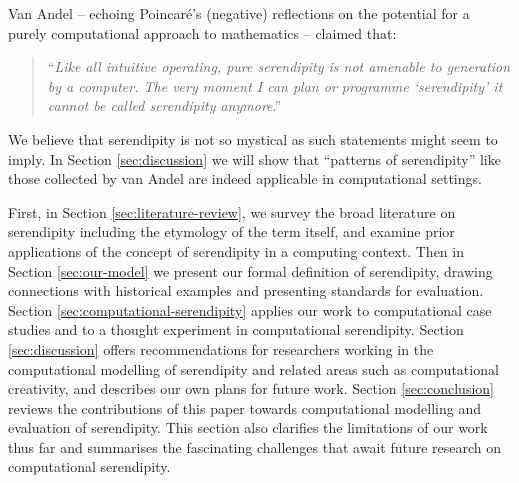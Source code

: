 Van Andel \citeyear{van1994anatomy} -- echoing Poincar\'e's
\citeyear{poincare1910creation} (negative) reflections on the potential
for a purely computational approach to mathematics -- claimed that:
\begin{quote}
``\emph{Like all intuitive operating, pure serendipity is not amenable
    to generation by a computer.  The very moment I can plan or
    programme `serendipity' it cannot be called serendipity
    anymore}.'' \cite{van1994anatomy}
\end{quote}
We believe that serendipity is not so mystical as such statements
might seem to imply.  In Section \ref{sec:discussion} we will
show that ``patterns of serendipity'' like those collected by van Andel
are indeed applicable in computational settings.

First, in
Section \ref{sec:literature-review}, we survey the broad literature on
serendipity including the etymology of the term itself, and examine prior applications of the concept of serendipity in a computing context.  Then in Section \ref{sec:our-model} we present our formal
definition of serendipity, drawing connections with historical examples 
and presenting standards for evaluation.  Section
\ref{sec:computational-serendipity} applies our work to computational case studies and
to a thought experiment in computational serendipity.  Section
\ref{sec:discussion} offers recommendations for researchers working in the computational modelling of serendipity and related areas such as computational creativity, and describes our own plans for future
work.  Section \ref{sec:conclusion} reviews the contributions of this paper towards computational modelling and evaluation of serendipity.  This section also clarifies the limitations of our work thus far and summarises the fascinating challenges that await future research on computational serendipity.



